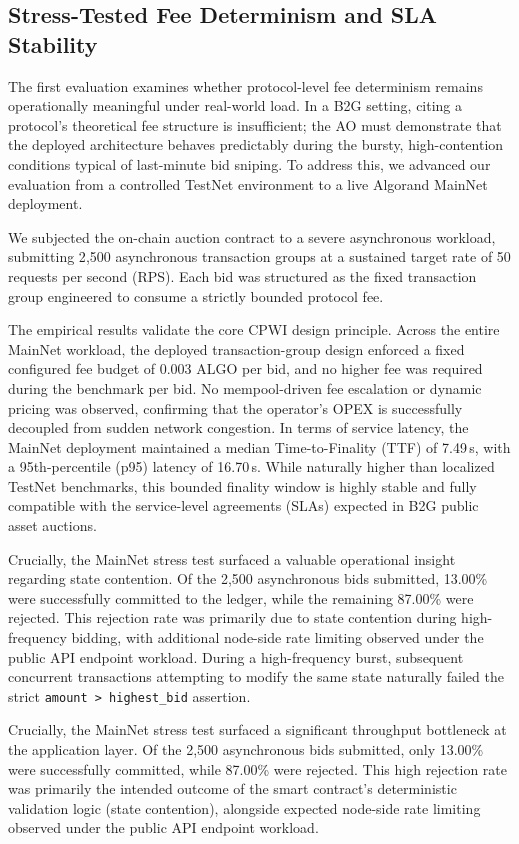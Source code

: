 \documentclass[runningheads]{llncs}
\begin{document}
\subsection{Stress-Tested Fee Determinism and SLA Stability}

The first evaluation examines whether protocol-level fee determinism remains operationally meaningful under real-world load. In a B2G setting, citing a protocol's theoretical fee structure is insufficient; the AO must demonstrate that the deployed architecture behaves predictably during the bursty, high-contention conditions typical of last-minute bid sniping. To address this, we advanced our evaluation from a controlled TestNet environment to a live Algorand MainNet deployment.

We subjected the on-chain auction contract to a severe asynchronous workload, submitting 2{,}500 asynchronous transaction groups at a sustained target rate of 50 requests per second (RPS). Each bid was structured as the fixed transaction group engineered to consume a strictly bounded protocol fee. 

The empirical results validate the core CPWI design principle. Across the entire MainNet workload, the deployed transaction-group design enforced a fixed configured fee budget of 0.003 ALGO per bid, and no higher fee was required during the benchmark per bid. No mempool-driven fee escalation or dynamic pricing was observed, confirming that the operator's OPEX is successfully decoupled from sudden network congestion. In terms of service latency, the MainNet deployment maintained a median Time-to-Finality (TTF) of 7.49\,s, with a 95th-percentile (p95) latency of 16.70\,s. While naturally higher than localized TestNet benchmarks, this bounded finality window is highly stable and fully compatible with the service-level agreements (SLAs) expected in B2G public asset auctions.

Crucially, the MainNet stress test surfaced a valuable operational insight regarding state contention. Of the 2{,}500 asynchronous bids submitted, 13.00\% were successfully committed to the ledger, while the remaining 87.00\% were rejected. This rejection rate was primarily due to state contention during high-frequency bidding, with additional node-side rate limiting observed under the public API endpoint workload. During a high-frequency burst, subsequent concurrent transactions attempting to modify the same state naturally failed the strict \texttt{amount > highest\_bid} assertion. 

Crucially, the MainNet stress test surfaced a significant throughput bottleneck at the application layer. Of the 2,500 asynchronous bids submitted, only 13.00\% were successfully committed, while 87.00\% were rejected. This high rejection rate was primarily the intended outcome of the smart contract's deterministic validation logic (state contention), alongside expected node-side rate limiting observed under the public API endpoint workload.
\end{document}
